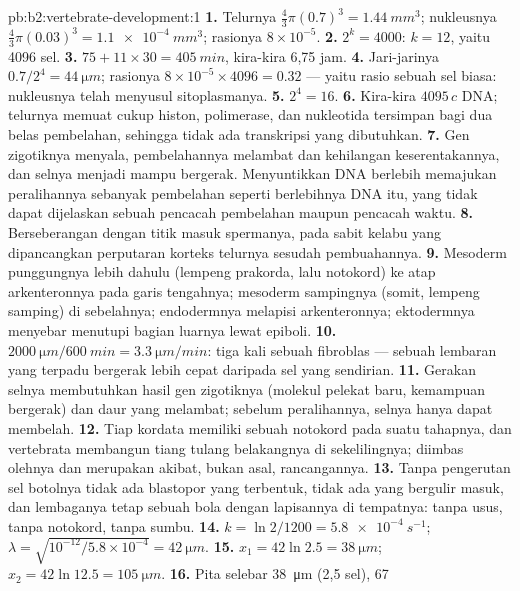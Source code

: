 \begin{solution}{pb:b2:vertebrate-development:1}
\textbf{1.} Telurnya $\tfrac43\pi(0.7)^{3} = \qty{1.44}{mm^3}$;
nukleusnya $\tfrac43\pi(0.03)^{3} = \qty{1.1e-4}{mm^3}$; rasionya
$8\times
10^{-5}$.
\textbf{2.} $2^{k} = 4000$: $k = 12$, yaitu 4096 sel.
\textbf{3.} $75 + 11\times 30 = \qty{405}{min}$, kira-kira 6,75 jam.
\textbf{4.} Jari-jarinya $0.7/2^{4} = \qty{44}{\micro m}$; rasionya
$8\times
10^{-5}\times 4096 = 0.32$ --- yaitu rasio sebuah sel biasa:
nukleusnya telah menyusul sitoplasmanya.
\textbf{5.} $2^{4} = 16$.
\textbf{6.} Kira-kira $4095\,c$ DNA; telurnya memuat cukup histon,
polimerase, dan nukleotida tersimpan bagi dua belas pembelahan,
sehingga tidak ada transkripsi yang dibutuhkan.
\textbf{7.} Gen zigotiknya menyala, pembelahannya melambat dan
kehilangan keserentakannya, dan selnya menjadi mampu bergerak.
Menyuntikkan DNA berlebih memajukan peralihannya sebanyak pembelahan
seperti berlebihnya DNA itu, yang tidak dapat dijelaskan sebuah
pencacah pembelahan maupun pencacah waktu.
\textbf{8.} Berseberangan dengan titik masuk spermanya, pada sabit
kelabu yang dipancangkan perputaran korteks telurnya sesudah
pembuahannya.
\textbf{9.} Mesoderm punggungnya lebih dahulu (lempeng prakorda, lalu
notokord) ke atap arkenteronnya pada garis tengahnya; mesoderm
sampingnya (somit, lempeng samping) di sebelahnya; endodermnya melapisi
arkenteronnya; ektodermnya menyebar menutupi bagian luarnya lewat
epiboli.
\textbf{10.} $\qty{2000}{\micro m}/\qty{600}{min} = \qty{3.3}{\micro
m/min}$: tiga kali sebuah fibroblas --- sebuah lembaran yang terpadu
bergerak lebih cepat daripada sel yang sendirian.
\textbf{11.} Gerakan selnya membutuhkan hasil gen zigotiknya (molekul
pelekat baru, kemampuan bergerak) dan daur yang melambat; sebelum
peralihannya, selnya hanya dapat membelah.
\textbf{12.} Tiap kordata memiliki sebuah notokord pada suatu tahapnya,
dan vertebrata membangun tiang tulang belakangnya di sekelilingnya;
 diimbas olehnya dan merupakan akibat, bukan asal,
rancangannya.
\textbf{13.} Tanpa pengerutan sel botolnya tidak ada blastopor yang
terbentuk, tidak ada yang bergulir masuk, dan lembaganya tetap sebuah
bola dengan lapisannya di tempatnya: tanpa usus, tanpa notokord, tanpa
sumbu.
\textbf{14.} $k = \ln 2/1200 = \qty{5.8e-4}{s^{-1}}$; $\lambda =
\sqrt{10^{-12}/5.8\times 10^{-4}} = \qty{42}{\micro m}$.
\textbf{15.} $x_1 = 42\ln 2.5 = \qty{38}{\micro m}$; $x_2 = 42\ln 12.5
= \qty{105}{\micro m}$.
\textbf{16.} Pita selebar \qty{38}{\micro m} (2,5 sel), \qty{67}{\micro
}
\end{solution}
